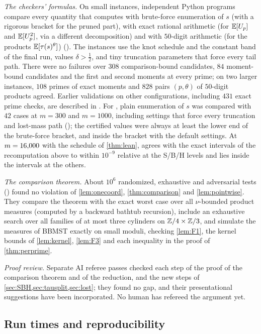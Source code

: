 \emph{The checkers' formulas.} On small instances, independent Python programs compare every quantity that
 computes with brute-force enumeration of $s$ (with a rigorous bracket for the pruned part), with exact
rational arithmetic (for $\mathbb{E}[U_p]$ and $\mathbb{E}[U_p^2]$, via a different decomposition) and with $50$-digit arithmetic (for
the products $\mathbb{E}[\tau(s)^\theta]$) (). The instances use the knot schedule and the
constant band of the final run, values $\delta>\frac12$, and tiny truncation parameters that force every tail path.
There were no failures over $308$ comparison-bound candidates, $84$ moment-bound candidates and the first and second
moments at every prime; on two larger instances, $108$ primes of exact moments and $828$ pairs $(p,\theta)$ of
$50$-digit products agreed. Earlier validations on other configurations, including $431$ exact prime checks, are
described in . For , plain enumeration of $s$ was compared with $42$ cases at
$m=300$ and $m=1000$, including settings that force every truncation and lost-mass path
(); the certified values were always at least the lower end of the brute-force
bracket, and inside the bracket with the default settings. At $m=16{,}000$ with the schedule of \cref{thm:lean},
 agrees with the exact intervals of the recomputation above to within $10^{-9}$ relative at the S/B/H
levels and lies inside the intervals at the others.

\emph{The comparison theorem.} About $10^6$ randomized, exhaustive and adversarial tests ()
found no violation of \cref{lem:onecoord}, \cref{thm:comparison} and \cref{lem:pointwise}. They compare the
theorem with the exact worst case over all $\nu$-bounded product measures (computed by a backward bathtub recursion),
include an exhaustive search over all families of at most three cylinders on $\mathbb{Z}/4\times\mathbb{Z}/3$, and simulate the
measures of BBMST exactly on small moduli, checking \cref{lem:F1}, the kernel bounds of \cref{lem:kernel},
\cref{lem:F3} and each inequality in the proof of \cref{thm:perprime}.

\emph{Proof review.} Separate AI referee passes checked each step of the proof of the comparison theorem and of the
reduction, and the new steps of \cref{sec:SBH,sec:tausplit,sec:lost}; they found no gap, and their presentational
suggestions have been incorporated. No human has refereed the argument yet.

\subsection{Run times and reproducibility}\label{sec:runtimes}

